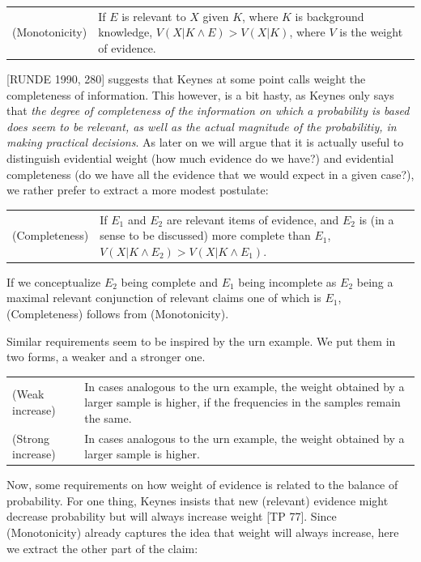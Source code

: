 \documentclass[
  10pt,
  dvipsnames,enabledeprecatedfontcommands]{scrartcl}
\begin{document}
\begin{tabular}{lp{11cm}}
(Monotonicity) & If $E$ is relevant to $X$ given $K$, where $K$ is background knowledge, $V(X\vert K \wedge E) > V(X\vert K)$, where $V$ is the weight of evidence.
\end{tabular}

{[}RUNDE 1990, 280{]} suggests that Keynes at some point calls weight
the completeness of information. This however, is a bit hasty, as Keynes
only says that
\emph{the degree of completeness of the information on which a probability is based does seem to be relevant, as well as the actual magnitude of the probabilitiy, in making practical decisions}.
As later on we will argue that it is actually useful to distinguish
evidential weight (how much evidence do we have?) and evidential
completeness (do we have all the evidence that we would expect in a
given case?), we rather prefer to extract a more modest postulate:

\begin{tabular}{lp{11cm}}
(Completeness) & If $E_1$ and $E_2$ are relevant items of evidence, and $E_2$ is (in a sense to be discussed) more complete than $E_1$,  $V(X\vert K \wedge E_2) > V(X\vert K \wedge E_1)$.
\end{tabular}

\noindent If we conceptualize \(E_2\) being complete and \(E_1\) being
incomplete as \(E_2\) being a maximal relevant conjunction of relevant
claims one of which is \(E_1\), (Completeness) follows from
(Monotonicity).

Similar requirements seem to be inspired by the urn example. We put them
in two forms, a weaker and a stronger one.

\begin{tabular}{lp{11cm}}
  (Weak increase) & In cases analogous to the urn example, the weight obtained by a larger sample is higher, if the frequencies in the samples remain the same.\\
  (Strong increase) & In cases analogous to the urn example, the weight obtained by a larger sample is higher.
  \end{tabular}

Now, some requirements on how weight of evidence is related to the
balance of probability. For one thing, Keynes insists that new
(relevant) evidence might decrease probability but will always increase
weight {[}TP 77{]}. Since (Monotonicity) already captures the idea that
weight will always increase, here we extract the other part of the
claim:
\end{document}
